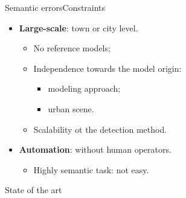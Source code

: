 \documentclass[10pt]{beamer}
\begin{document}
            \begin{frame}{Semantic errors}{Constraints}
                \begin{itemize}[label=$\blacktriangleright$, font=\color{IGNGreen}]
                    \item<1-> \textbf{Large-scale}: town or city level.
                        \begin{itemize}
                            \item<2-6> No reference models;
                            \item<3-6> Independence towards the model origin:
                            \begin{itemize}
                                \item<4-6> modeling approach;
                                \item<5-6> urban scene.
                            \end{itemize}
                            \item<6> Scalability ot the detection method.
                        \end{itemize}
                    \item<7-8> \textbf{Automation}: without human operators.
                        \begin{itemize}
                            \item<8> Highly semantic task: not easy.
                        \end{itemize}
                \end{itemize}
            \end{frame}

        \begin{frame}{State of the art}
            \centering
            
        \end{frame}
\end{document}
